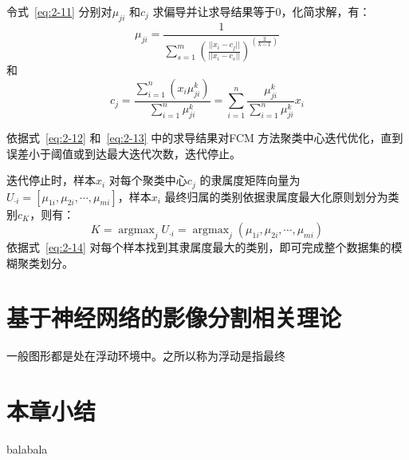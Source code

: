 令式~\ref{eq:2-11} 分别对$\mu_{ji}$ 和$c_j$ 求偏导并让求导结果等于$0$，化简求解，有：
\begin{equation}
  \label{eq:2-12}
  \mu_{ji} = \frac{1}{\sum_{s=1}^m(\frac{||x_i-c_j||}{||x_i-c_s||})^{(\frac{2}{k-1})}}
\end{equation}
和
\begin{equation}
  \label{eq:2-13}
  c_j = \frac{\sum_{i=1}^n(x_i\mu_{ji}^k)}{\sum_{i=1}^n\mu_{ji}^k} = \sum_{i=1}^n \frac{\mu_{ji}^k}{\sum_{i=1}^n\mu_{ji}^k}x_i
\end{equation}

依据式~\ref{eq:2-12} 和~\ref{eq:2-13} 中的求导结果对FCM 方法聚类中心迭代优化，直到误差小于阈值或到达最大迭代次数，迭代停止。

迭代停止时，样本$x_i$ 对每个聚类中心$c_j$ 的隶属度矩阵向量为$U_{\cdot i} = [\mu_{1i},\mu_{2i},\cdots,\mu_{mi}]$，样本$x_i$ 最终归属的类别依据隶属度最大化原则划分为类别$c_K$，则有：
\begin{equation}
  \label{eq:2-14}
  K = \mathop{\arg\max}_{j} U_{\cdot i} = \mathop{\arg\max}_{j} (\mu_{1i},\mu_{2i},\cdots,\mu_{mi})
\end{equation}
依据式~\ref{eq:2-14} 对每个样本找到其隶属度最大的类别，即可完成整个数据集的模糊聚类划分。

\section{基于神经网络的影像分割相关理论}
\label{sec:chap02-2}

一般图形都是处在浮动环境中。之所以称为浮动是指最终


\section{本章小结}
\label{sec:chap02-3}
balabala